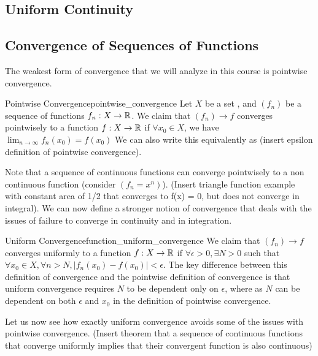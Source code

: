\subsection{Uniform Continuity}
\subsection{Convergence of Sequences of Functions}
The weakest form of convergence that we will analyze in this course is pointwise convergence.
\begin{defn}{Pointwise Convergence}{pointwise_convergence}
Let \(X\) be a set , and \((f_n)\) be a sequence of functions \(f_n: X \to {\mathbb R}\). We claim that \((f_n) \to f\) converges pointwisely to a function \(f: X \to {\mathbb R}\) if \(\forall x_0 \in X\), we have \(\lim_{n \to \infty} f_n(x_0) = f(x_0)\) We can also write this equivalently as (insert epsilon definition of pointwise convergence).
\end{defn}
Note that a sequence of continuous functions can converge pointwisely to a non continuous function (consider \((f_n = x^n)\)). (Insert triangle function example with constant area of 1/2 that converges to f(x) = 0, but does not converge in integral). We can now define a stronger notion of convergence that deals with the issues of failure to converge in continuity and in integration. 
\begin{defn}{Uniform Convergence}{function_uniform_convergence}
We claim that \((f_n) \to f\) converges uniformly to a function \(f: X \to {\mathbb R}\) if \(\forall \epsilon > 0,\exists N > 0\) such that \(\forall x_0 \in X,\forall n > N, |f_n(x_0) - f(x_0)| < \epsilon\). The key difference between this definition of convergence and the pointwise definition of convergence is that uniform convergence requires \(N\) to be dependent only on \(\epsilon\), where as \(N\) can be dependent on both \(\epsilon\) and \(x_0\) in the definition of pointwise convergence.
\end{defn}
Let us now see how exactly uniform convergence avoids some of the issues with pointwise convergence.
(Insert theorem that a sequence of continuous functions that converge uniformly implies that their convergent function is also continuous)
